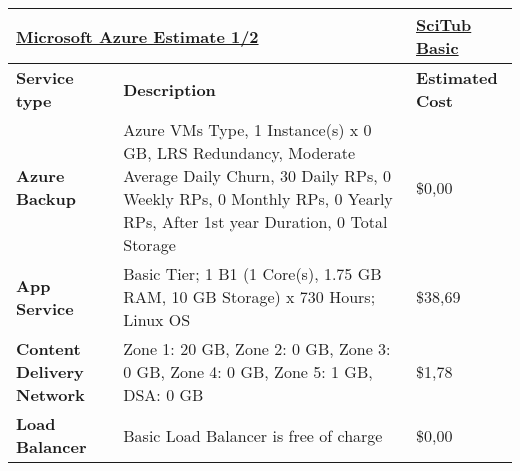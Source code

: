 %

\begin{adjustbox}{angle=90}
                \begin{tabularx}{\textheight}{|l||X|m{4cm}|}
                \hline
                \multicolumn{2}{|l|}{{\ul \textbf{Microsoft Azure Estimate 1/2}}}                     & {\ul \textbf{SciTub Basic}}                         \\ \hline
                \textbf{Service type}             & \textbf{Description}                                                                                                                                                                         & \textbf{Estimated Cost}                  \\ \hline\hline
                \textbf{Azure Backup}             & Azure VMs Type, 1 Instance(s) x 0 GB, LRS Redundancy, Moderate Average Daily Churn, 30 Daily RPs, 0 Weekly RPs, 0 Monthly RPs, 0 Yearly RPs,  After 1st year Duration, 0 Total Storage       & \$0,00                                   \\ \hline
                \textbf{App Service}              & Basic Tier; 1 B1 (1 Core(s), 1.75 GB RAM, 10 GB Storage) x 730 Hours; Linux OS                                                                                                               & \$38,69                                  \\ \hline
                \textbf{Content Delivery Network} & Zone 1: 20 GB, Zone 2: 0 GB, Zone 3: 0 GB, Zone 4: 0 GB, Zone 5: 1 GB, DSA: 0 GB                                                                                                             & \$1,78                                   \\ \hline
                \textbf{Load Balancer}            & Basic Load Balancer is free of charge                                                                                                                                                        & \$0,00                                   \\ \hline

\end{tabularx}
\end{adjustbox}
